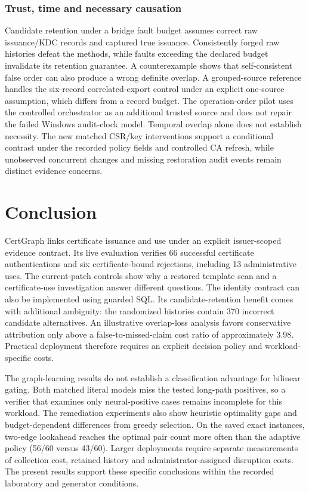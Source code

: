 \subsubsection{Trust, time and necessary causation}
 Candidate retention under a bridge fault budget assumes correct raw issuance/KDC records and captured true issuance. Consistently forged raw histories defeat the methods, while faults exceeding the declared budget invalidate its retention guarantee. A counterexample shows that self-consistent false order can also produce a wrong definite overlap. A grouped-source reference handles the six-record correlated-export control under an explicit one-source assumption, which differs from a record budget. The operation-order pilot uses the controlled orchestrator as an additional trusted source and does not repair the failed Windows audit-clock model. Temporal overlap alone does not establish necessity. The new matched CSR/key interventions support a conditional contrast under the recorded policy fields and controlled CA refresh, while unobserved concurrent changes and missing restoration audit events remain distinct evidence concerns.


\section{Conclusion}
\label{sec:conclusion}
CertGraph links certificate issuance and use under an explicit issuer-scoped evidence contract. Its live evaluation verifies 66 successful certificate authentications and six certificate-bound rejections, including 13 administrative uses. The current-patch controls show why a restored template scan and a certificate-use investigation answer different questions. The identity contract can also be implemented using guarded SQL. Its candidate-retention benefit comes with additional ambiguity: the randomized histories contain 370 incorrect candidate alternatives. An illustrative overlap-loss analysis favors conservative attribution only above a false-to-missed-claim cost ratio of approximately 3.98. Practical deployment therefore requires an explicit decision policy and workload-specific costs.

The graph-learning results do not establish a classification advantage for bilinear gating. Both matched literal models miss the tested long-path positives, so a verifier that examines only neural-positive cases remains incomplete for this workload. The remediation experiments also show heuristic optimality gaps and budget-dependent differences from greedy selection. On the saved exact instances, two-edge lookahead reaches the optimal pair count more often than the adaptive policy (56/60 versus 43/60). Larger deployments require separate measurements of collection cost, retained history and administrator-assigned disruption costs. The present results support these specific conclusions within the recorded laboratory and generator conditions.

